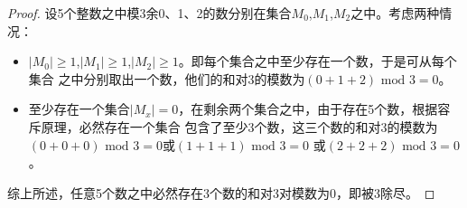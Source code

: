 \begin{proof}
    设5个整数之中模3余0、1、2的数分别在集合$M_0$,$M_1$,$M_2$之中。考虑两种情况：
    \begin{itemize}
        \item $|M_0|\ge 1$,$|M_1|\ge 1$,$|M_2|\ge 1$。即每个集合之中至少存在一个数，于是可从每个集合
        之中分别取出一个数，他们的和对3的模数为$(0+1+2) \text{ mod } 3=0$。
        \item 至少存在一个集合$|M_x|=0$，在剩余两个集合之中，由于存在5个数，根据容斥原理，必然存在一个集合
        包含了至少3个数，这三个数的和对3的模数为$(0+0+0) \text{ mod } 3=0$或$(1+1+1) \text{ mod } 3=0$
        或$(2+2+2) \text{ mod } 3=0$。
    \end{itemize}
    综上所述，任意5个数之中必然存在3个数的和对3对模数为0，即被3除尽。
\end{proof}